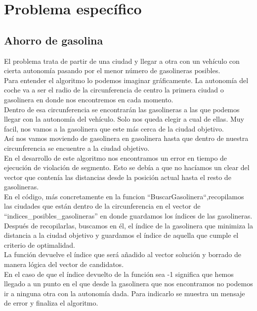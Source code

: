 \documentclass[11pt,a4paper]{article} %
\begin{document}
\newpage
\section{Problema específico}
\subsection{Ahorro de gasolina}
El problema trata de partir de una ciudad y llegar a otra con un vehículo con cierta autonomía pasando por el menor número de gasolineras posibles.\\

Para entender el algoritmo lo podemos imaginar gráficamente. La autonomía del coche va a ser el radio de la circunferencia de centro la primera ciudad o gasolinera en donde nos encontremos en cada momento.\\

Dentro de esa circunferencia se encontrarán las gasolineras a las que podemos llegar con la autonomía del vehículo. Solo nos queda elegir a cual de ellas. Muy facil, nos vamos a la gasolinera que este más cerca de la ciudad objetivo. \\

Así nos vamos moviendo de gasolinera en gasolinera hasta que dentro de nuestra circunferencia se encuentre a la ciudad objetivo.\\

En el desarrollo de este algoritmo nos encontramos un error en tiempo de ejecución de violación de segmento. Esto se debía a que no hacíamos un clear del vector que contenía las distancias desde la posición actual hasta el resto de gasolineras.\\

En el código, más concretamente en la funcion “BuscarGasolinera“,recopilamos las ciudades que están dentro de la circunferencia en el vector de “indices\_posibles\_gasolineras” en donde guardamos los índices de las gasolineras.\\

Después de recopilarlas, buscamos en él, el índice de la gasolinera que minimiza la distancia a la ciudad objetivo y guardamos el índice de aquella que cumple el criterio de optimalidad.\\

La función devuelve el índice que será añadido al vector solución y borrado de manera lógica del vector de candidatos.\\

En el caso de que el índice devuelto de la función sea -1 significa que hemos llegado a un punto en el que desde la gasolinera que nos encontramos no podemos ir a ninguna otra con la autonomía dada. Para indicarlo se muestra un mensaje de error y finaliza el algoritmo.\\
\end{document}
